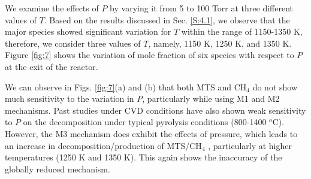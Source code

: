 \documentclass[final, letterpaper, square, comma, numbers, sort&compress]{elsarticle}
\begin{document}
We examine the effects of $P$ by varying it from 5 to 100 Torr at three different values of $T$. Based on the results discussed in Sec. \ref{S:4.1}, we observe that the major species showed significant variation for $T$ within the range of 1150-1350 K, therefore, we consider three values of $T$, namely, 1150 K, 1250 K, and 1350 K. Figure \ref{fig:7} shows the variation of mole fraction of six species with respect to $P$ at the exit of the reactor. 

We can observe in Figs. \ref{fig:7}(a) and (b) that both MTS and CH$_4$ do not show much sensitivity to the variation in $P$, particularly while using M1 and M2 mechanisms. Past studies under CVD conditions have also shown weak sensitivity to $P$ on the decomposition under typical pyrolysis conditions (800-1400 $^o$C). However, the M3 mechanism does exhibit the effects of pressure, which leads to an increase in decomposition/production of MTS/CH$_4$ , particularly at higher temperatures (1250 K and 1350 K). This again shows the inaccuracy of the globally reduced mechanism. 
\end{document}
